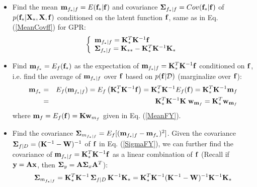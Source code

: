 \documentclass{article}
\begin{document}
\begin{itemize}
\item Find the mean ${\bf m}_{f_*|f}=E({\bf f}_*|{\bf f})$ and 
  covariance ${\bf\Sigma}_{f_*|f}=Cov({\bf f}_*|{\bf f})$ of 
  $p({\bf f}_*|{\bf X}_*,{\bf X},{\bf f})$ conditioned
  on the latent function ${\bf f}$, same as in Eq. (\ref{MeanCovff}) 
  for GPR:
  \begin{equation}
    \left\{  \begin{array}{lcl}
      {\bf m}_{f_*|f}={\bf K}_*^T {\bf K}^{-1} {\bf f} \\
      {\bf\Sigma}_{f_*|f}={\bf K}_{**}-{\bf K}_*^T{\bf K}^{-1} {\bf K}_*
    \end{array}\right.
    \label{MeanCovffGPC}
  \end{equation}

\item Find ${\bf m}_{f_*}=E_f({\bf f}_*)$ as the expectation of
  ${\bf m}_{f_*|f}={\bf K}_*^T {\bf K}^{-1}{\bf f}$ conditioned on 
  ${\bf f}$, i.e. find the average of ${\bf m}_{f_*|f}$ over ${\bf f}$ 
  based on $p({\bf f}|{\cal D})$ (marginalize over ${\bf f}$):
  \begin{eqnarray}
    {\bf m}_{f_*}&=&E_f ({\bf m}_{f_*|f})
    =E_f \left( {\bf K}_*^T {\bf K}^{-1} {\bf f} \right)
    ={\bf K}_*^T {\bf K}^{-1} E_f({\bf f})={\bf K}_*^T {\bf K}^{-1} {\bf m}_f
    \nonumber\\
    &=&{\bf K}_*^T {\bf K}^{-1}{\bf K}\;{\bf w}_{{\bf m}_f}
    ={\bf K}_*^T {\bf w}_{{\bf m}_f}
    \label{MeanFsY}
  \end{eqnarray}
  where ${\bf m}_f=E_f({\bf f})={\bf K}{\bf w}_{m_f}$ given in 
  Eq. (\ref{MeanFY}).

\item Find the covariance ${\bf\Sigma}_{m_{f_*|f}}=E_f[({\bf m}_{f_*|f}-{\bf m}_{f_*})^2]$.
  Given the covariance ${\bf\Sigma}_{f|D}=({\bf K}^{-1}-{\bf W})^{-1}$
  of ${\bf f}$ in Eq. (\ref{SigmaFY}), we can further find the covariance of
  ${\bf m}_{f_*|f}={\bf K}_*^T {\bf K}^{-1}{\bf f}$ as a linear combination 
  of ${\bf f}$ (Recall if ${\bf y}={\bf Ax}$, then 
  ${\bf\Sigma}_y={\bf A\Sigma}_x{\bf A}^T$):
  \begin{equation}
    {\bf\Sigma}_{m_{f_*|f}}
    ={\bf K}_*^T {\bf K}^{-1}\,{\bf\Sigma}_{f|D} \,{\bf K}^{-1}{\bf K}_*
    ={\bf K}_*^T {\bf K}^{-1} ({\bf K}^{-1}-{\bf W})^{-1} {\bf K}^{-1}{\bf K}_*
  \end{equation}


\end{itemize}
\end{document}
